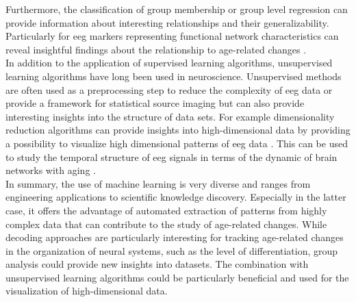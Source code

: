 Furthermore, the classification of group membership or group level regression can provide information about interesting relationships and their generalizability. Particularly for \gls{eeg} markers representing functional network characteristics can reveal insightful findings about the relationship to age-related changes \cite{Petti2016}.\\
In addition to the application of supervised learning algorithms, unsupervised learning algorithms have long been used in neuroscience. Unsupervised methods are often used as a preprocessing step to reduce the complexity of \gls{eeg} data or provide a framework for statistical source imaging but can also provide interesting insights into the structure of data sets. For example dimensionality reduction algorithms can provide insights into high-dimensional data by providing a possibility to visualize high dimensional patterns of \gls{eeg} data \cite{Kottlarz2020, Banville2021}. This can be used to study the temporal structure of \gls{eeg} signals in terms of the dynamic of brain networks with aging \cite{Brunton2016, vieluf2018age}.\\
In summary, the use of machine learning is very diverse and ranges from engineering applications to scientific knowledge discovery. Especially in the latter case, it offers the advantage of automated extraction of patterns from highly complex data that can contribute to the study of age-related changes. While decoding approaches are particularly interesting for tracking age-related changes in the organization of neural systems, such as the level of differentiation, group analysis could provide new insights into datasets. The combination with unsupervised learning algorithms could be particularly beneficial and used for the visualization of high-dimensional data.

